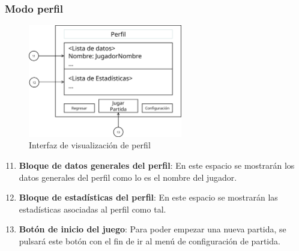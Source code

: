\subsubsection{Modo perfil}
\begin{figure}[H]
    \centering
    \includegraphics[width=0.6\textwidth]{5-Cuerpo/Chapter5/I3.png} %
    \caption{Interfaz de visualización de perfil}
    \label{fig:Interface_Perfil}
\end{figure}
\begin{enumerate}\setcounter{enumi}{10}
    \item \textbf{Bloque de datos generales del perfil}: En este espacio se
    mostrarán los datos generales del perfil como lo es el nombre del jugador.
    \item \textbf{Bloque de estadísticas del perfil}: En este espacio se
    mostrarán las estadísticas asociadas al perfil como tal.
    \item \textbf{Botón de inicio del juego}: Para poder empezar una nueva
    partida, se pulsará este botón con el fin de ir al menú de configuración de
    partida.
\end{enumerate}

